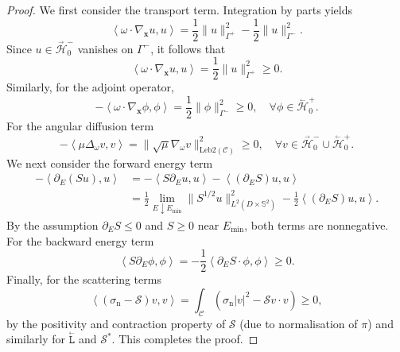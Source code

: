\documentclass[10pt,a4paper]{amsart}
\newcommand{\bL}{\stackrel{_\leftarrow}{\mathtt L}}
\newcommand{\cH}{\stackrel{_\rightarrow}{\mathscr H}}
\newcommand{\cS}{\ensuremath{\mathscr S}}
\newcommand{\cbH}{\stackrel{_\leftarrow}{\mathscr H}}
\newcommand{\leb}{\text{Leb}}
\newcommand{\ltwop}[2]{\ensuremath{\!\left\langle{#1,#2}\right\rangle}}
\renewcommand{\vec}[1]{\ensuremath{\boldsymbol{#1}}}
\begin{document}
\begin{proof}
We first consider the transport term. Integration by parts yields
\begin{equation}
  \ltwop{\omega \cdot \nabla_{\vec x} u}{u}
  =
  \frac{1}{2} \|u\|^2_{\Gamma^+}
  - \frac{1}{2} \|u\|^2_{\Gamma^-}.
\end{equation}
Since $u \in \cH_0^-$ vanishes on $\Gamma^-$, it follows that
\begin{equation}
  \ltwop{\omega \cdot \nabla_{\vec x} u}{u}
  = \frac{1}{2} \|u\|^2_{\Gamma^+} \geq 0.
\end{equation}
Similarly, for the adjoint operator,
\begin{equation}
  -\ltwop{\omega \cdot \nabla_{\vec x} \phi}{\phi}
  = \frac{1}{2} \|\phi\|^2_{\Gamma^-} \geq 0,
  \quad \forall \phi \in \cbH_0^+.
\end{equation}
For the angular diffusion term
\begin{equation}
  -\ltwop{\mu \Delta_\omega v}{v}
  = \|\sqrt{\mu} \nabla_\omega v\|^2_{\leb2(\mathcal{C})} \geq 0,
  \quad \forall v \in \cH_0^- \cup \cbH_0^+.
\end{equation}
We next consider the forward energy term
\begin{align}
  -\ltwop{\partial_E(S u)}{u}
  &= - \ltwop{S \partial_E u}{u} - \ltwop{(\partial_E S) u}{u} \\
  &= \frac{1}{2} \lim_{E \downarrow E_{\min}} \|S^{1/2} u\|^2_{L^2(D \times \mathbb{S}^2)}
  - \frac{1}{2} \ltwop{(\partial_E S) u}{u}.
\end{align}
By the assumption $\partial_E S \leq 0$ and $S \geq 0$ near
$E_{\min}$, both terms are nonnegative. For the backward energy term
\begin{equation}
  \ltwop{S \partial_E \phi}{\phi}
  = - \frac{1}{2} \ltwop{\partial_E S \cdot \phi}{\phi} \geq 0.
\end{equation}
Finally, for the scattering terms
\begin{equation}
  \ltwop{(\sigma_{\mathrm{n}} - \cS) v}{v}
  = \int_{\mathcal{C}} \left( \sigma_{\mathrm{n}} |v|^2 - \cS v \cdot v \right) \geq 0,
\end{equation}
by the positivity and contraction property of $\cS$ (due to
normalisation of $\pi$) and similarly for $\bL$ and $\cS^*$. This
completes the proof.
\end{proof}
\end{document}
